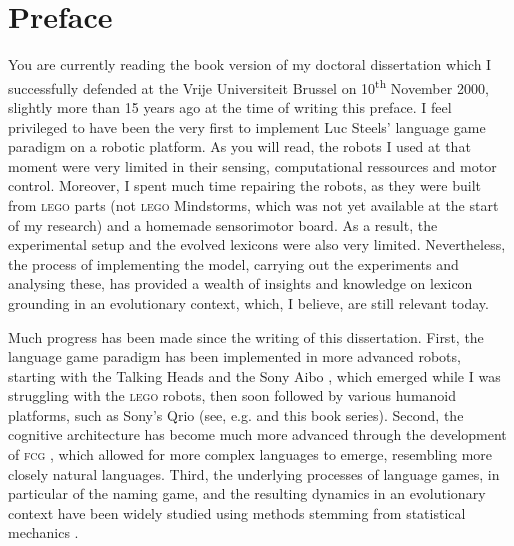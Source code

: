 \chapter*{Preface}

You are currently reading the book version of my doctoral dissertation which I successfully defended at the Vrije Universiteit Brussel on 10\textsuperscript{th} November 2000, slightly more than 15 years ago at the time of writing this preface. I feel privileged to have been the very first to implement Luc Steels' language game paradigm on a robotic platform. As you will read, the robots I used at that moment were very limited in their sensing, computational ressources and motor control. Moreover, I spent much time repairing the robots, as they were built from \textsc{lego} parts (not \textsc{lego} Mindstorms, which was not yet available at the start of my research) and a homemade sensorimotor board. As a result, the experimental setup and the evolved lexicons were also very limited. Nevertheless, the process of implementing the model, carrying out the experiments and analysing these, has provided a wealth of insights and knowledge on lexicon grounding in an evolutionary context, which, I believe, are still relevant today.

Much progress has been made since the writing of this dissertation. First, the language game paradigm has been implemented in more advanced robots, starting with the Talking Heads \citep{steelsetal:2002} and the Sony Aibo \citep{steelskaplan:2000}, which emerged while I was struggling with the \textsc{lego} robots, then soon followed by various humanoid platforms, such as Sony's Qrio (see, e.g. \citealt{steels:2012} and this book series). Second, the cognitive architecture has become much more advanced through the development of \textsc{fcg} \citep{steelsdebeule:2006}, which allowed for more complex languages to emerge, resembling more closely natural languages. Third, the underlying processes of language games, in particular of the naming game, and the resulting dynamics in an evolutionary context have been widely studied using methods stemming from statistical mechanics \citep[e.g., ][]{baronchellietal:2006a}.

